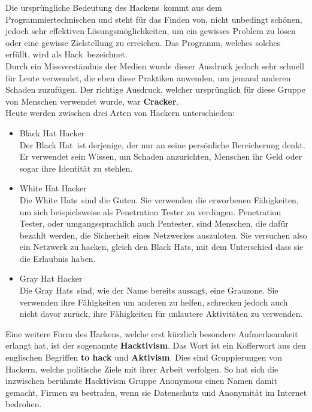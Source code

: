 \documentclass[12pt,a4paper]{report}
\begin{document}
\begin{onehalfspace}
Die ursprüngliche Bedeutung des \glqq Hackens\grqq \ kommt aus dem Programmiertechnischen und steht für das Finden von, nicht unbedingt schönen, jedoch sehr effektiven Lösungsmöglichkeiten, um ein gewisses Problem zu lösen oder eine gewisse Zielstellung zu erreichen. Das Programm, welches solches erfüllt, wird als \glqq Hack\grqq \ bezeichnet.\\
Durch ein Missverständnis der Medien wurde dieser Ausdruck jedoch sehr schnell für Leute verwendet, die eben diese Praktiken anwenden, um jemand anderen Schaden zuzufügen. Der richtige Ausdruck, welcher ursprünglich für diese Gruppe von Menschen verwendet wurde, war \textbf{Cracker}.\\

Heute werden zwischen drei Arten von Hackern unterschieden:
\begin{itemize}
\item Black Hat Hacker\\
Der \glqq Black Hat\grqq \ ist derjenige, der nur an seine persönliche Bereicherung denkt. Er verwendet sein Wissen, um Schaden anzurichten, Menschen ihr Geld oder sogar ihre Identität zu stehlen. 
\item White Hat Hacker\\
Die \glqq White Hats\grqq \ sind die \glqq Guten\grqq . Sie verwenden die erworbenen Fähigkeiten, um sich beispielsweise als Penetration Tester zu verdingen. Penetration Tester, oder umgangssprachlich auch Pentester, sind Menschen, die dafür bezahlt werden, die Sicherheit eines Netzwerkes auszuloten. Sie versuchen also ein Netzwerk zu hacken, gleich den Black Hats, mit dem Unterschied dass sie die Erlaubnis haben.
\item Gray Hat Hacker\\
Die \glqq Gray Hats\grqq \ sind, wie der Name bereits aussagt, eine Grauzone. Sie verwenden ihre Fähigkeiten um anderen zu helfen, schrecken jedoch auch nicht davor zurück, ihre Fähigkeiten für unlautere Aktivitäten zu verwenden.
\end{itemize}

Eine weitere Form des Hackens, welche erst kürzlich besondere Aufmerksamkeit erlangt hat, ist der sogenannte \textbf{Hacktivism}. Das Wort ist ein Kofferwort aus den englischen Begriffen \textbf{to hack} und \textbf{Aktivism}. Dies sind Gruppierungen von Hackern, welche politische Ziele mit ihrer Arbeit verfolgen. So hat sich die inzwischen berühmte Hacktivism Gruppe Anonymous einen Namen damit gemacht, Firmen zu \glqq bestrafen\grqq , wenn sie Datenschutz und Anonymität im Internet bedrohen.\\


\end{onehalfspace}
\end{document}
